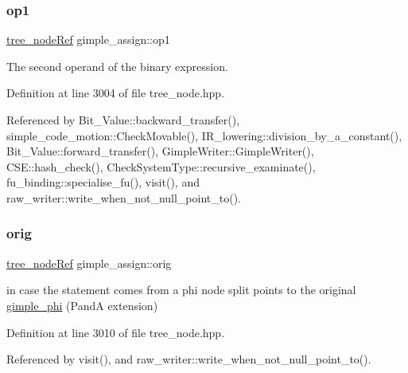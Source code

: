 \subsubsection{\texorpdfstring{op1}{op1}}
{\footnotesize\ttfamily \hyperlink{tree__node_8hpp_a6ee377554d1c4871ad66a337eaa67fd5}{tree\+\_\+node\+Ref} gimple\+\_\+assign\+::op1}



The second operand of the binary expression. 



Definition at line 3004 of file tree\+\_\+node.\+hpp.



Referenced by Bit\+\_\+\+Value\+::backward\+\_\+transfer(), simple\+\_\+code\+\_\+motion\+::\+Check\+Movable(), I\+R\+\_\+lowering\+::division\+\_\+by\+\_\+a\+\_\+constant(), Bit\+\_\+\+Value\+::forward\+\_\+transfer(), Gimple\+Writer\+::\+Gimple\+Writer(), C\+S\+E\+::hash\+\_\+check(), Check\+System\+Type\+::recursive\+\_\+examinate(), fu\+\_\+binding\+::specialise\+\_\+fu(), visit(), and raw\+\_\+writer\+::write\+\_\+when\+\_\+not\+\_\+null\+\_\+point\+\_\+to().

\mbox{\label{structgimple__assign_ab154230ba593420c0c7bc5c98ca3586b}} 
\subsubsection{\texorpdfstring{orig}{orig}}
{\footnotesize\ttfamily \hyperlink{tree__node_8hpp_a6ee377554d1c4871ad66a337eaa67fd5}{tree\+\_\+node\+Ref} gimple\+\_\+assign\+::orig}



in case the statement comes from a phi node split points to the original \hyperlink{structgimple__phi}{gimple\+\_\+phi} (PandA extension) 



Definition at line 3010 of file tree\+\_\+node.\+hpp.



Referenced by visit(), and raw\+\_\+writer\+::write\+\_\+when\+\_\+not\+\_\+null\+\_\+point\+\_\+to().

\mbox{\label{structgimple__assign_aa6108e3d98b4e73c1401f1711096baa6}} 
